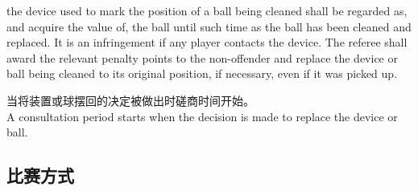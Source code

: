\begin{enumerate}[label=(\alph*)]
\begin{enumerate}[label=(\roman*)]
        the device used to mark the position of a ball being cleaned shall be regarded as, and acquire the value of, the ball until such time as the ball has been cleaned and replaced. It is an infringement if any player contacts the device. The referee shall award the relevant penalty points to the non-offender and replace the device or ball being cleaned to its original position, if necessary, even if it was picked up.
    
        当将装置或球摆回的决定被做出时磋商时间开始。\\
        A consultation period starts when the decision is made to replace the device or ball.
    \end{enumerate}
\end{enumerate}

\subsection{比赛方式}\label{2233}

